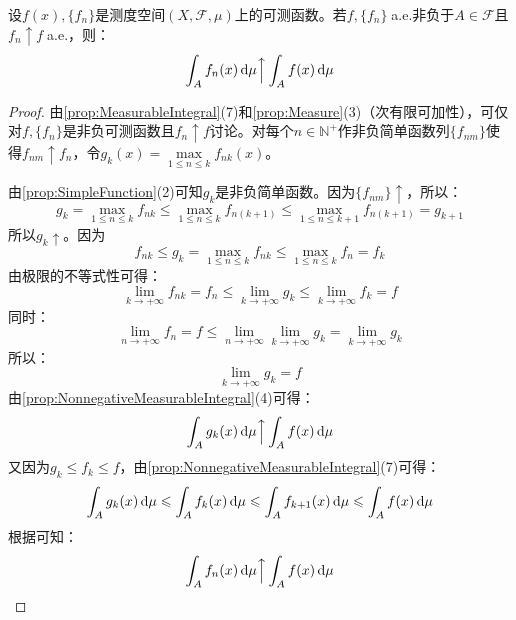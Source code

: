 \begin{theorem}\label{theo:LeviTheorem}
	设$f(x),\{f_n\}$是测度空间$(X,\mathscr{F},\mu)$上的可测函数。若$f,\{f_n\}\;$a.e.非负于$A\in\mathscr{F}$且$f_n\uparrow f\;$a.e.，则：
	\begin{equation*}
		\int_{A}f_n(x)\mathop{}\!\mathrm{d}\mu\Big\uparrow\int_{A}f(x)\mathop{}\!\mathrm{d}\mu
	\end{equation*}
\end{theorem}
\begin{proof}
	由\cref{prop:MeasurableIntegral}(7)和\cref{prop:Measure}(3)（次有限可加性），可仅对$f,\{f_n\}$是非负可测函数且$f_n\uparrow f$讨论。对每个$n\in\mathbb{N}^+$作非负简单函数列$\{f_{nm}\}$使得$f_{nm}\uparrow f_n$，令$g_k(x)=\max\limits_{1\leqslant n\leqslant k}f_{nk}(x)$。\par
	由\cref{prop:SimpleFunction}(2)可知$g_k$是非负简单函数。因为$\{f_{nm}\}\uparrow$，所以：
	\begin{equation*}
		g_k=\max_{1\leqslant n\leqslant k}f_{nk}\leqslant\max_{1\leqslant n\leqslant k}f_{n(k+1)}\leqslant\max_{1\leqslant n\leqslant k+1}f_{n(k+1)}=g_{k+1}
	\end{equation*}
	所以$g_k\uparrow$。因为
	\begin{equation*}
		f_{nk}\leqslant g_k=\max_{1\leqslant n\leqslant k}f_{nk}\leqslant\max_{1\leqslant n\leqslant k}f_n=f_k
	\end{equation*}
	由极限的不等式性可得：
	\begin{equation*}
		\lim_{k\to+\infty}f_{nk}=f_n\leqslant\lim_{k\to+\infty}g_k\leqslant\lim_{k\to+\infty}f_k=f
	\end{equation*}
	同时：
	\begin{equation*}
		\lim_{n\to+\infty}f_n=f\leqslant\lim_{n\to+\infty}\lim_{k\to+\infty}g_k=\lim_{k\to+\infty}g_k
	\end{equation*}
	所以：
	\begin{equation*}
		\lim_{k\to+\infty}g_k=f
	\end{equation*}
	由\cref{prop:NonnegativeMeasurableIntegral}(4)可得：
	\begin{equation*}
		\int_{A}g_k(x)\mathop{}\!\mathrm{d}\mu\Big\uparrow\int_{A}f(x)\mathop{}\!\mathrm{d}\mu
	\end{equation*}
	又因为$g_k\leqslant f_k\leqslant f$，由\cref{prop:NonnegativeMeasurableIntegral}(7)可得：
	\begin{equation*}
		\int_{A}g_k(x)\mathop{}\!\mathrm{d}\mu\leqslant\int_{A}f_k(x)\mathop{}\!\mathrm{d}\mu\leqslant\int_{A}f_{k+1}(x)\mathop{}\!\mathrm{d}\mu\leqslant\int_{A}f(x)\mathop{}\!\mathrm{d}\mu
	\end{equation*}
	根据可知：
	\begin{equation*}
		\int_{A}f_n(x)\mathop{}\!\mathrm{d}\mu\Big\uparrow\int_{A}f(x)\mathop{}\!\mathrm{d}\mu\qedhere
	\end{equation*}
\end{proof}
